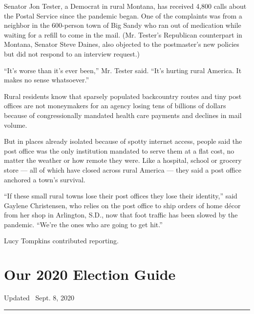 Senator Jon Tester, a Democrat in rural Montana, has received 4,800
calls about the Postal Service since the pandemic began. One of the
complaints was from a neighbor in the 600-person town of Big Sandy who
ran out of medication while waiting for a refill to come in the mail.
(Mr. Tester's Republican counterpart in Montana, Senator Steve Daines,
also objected to the postmaster's new policies but did not respond to an
interview request.)

``It's worse than it's ever been,'' Mr. Tester said. ``It's hurting
rural America. It makes no sense whatsoever.''

Rural residents know that sparsely populated backcountry routes and tiny
post offices are not moneymakers for an agency losing tens of billions
of dollars because of congressionally mandated health care payments and
declines in mail volume.

But in places already isolated because of spotty internet access, people
said the post office was the only institution mandated to serve them at
a flat cost, no matter the weather or how remote they were. Like a
hospital, school or grocery store --- all of which have closed across
rural America --- they said a post office anchored a town's survival.

``If these small rural towns lose their post offices they lose their
identity,'' said Gaylene Christensen, who relies on the post office to
ship orders of home décor from her shop in Arlington, S.D., now that
foot traffic has been slowed by the pandemic. ``We're the ones who are
going to get hit.''

Lucy Tompkins contributed reporting.

\hypertarget{our-2020-election-guide}{%
\section{Our 2020 Election Guide}\label{our-2020-election-guide}}

Updated ~Sept. 8, 2020

\begin{center}\rule{0.5\linewidth}{\linethickness}\end{center}

